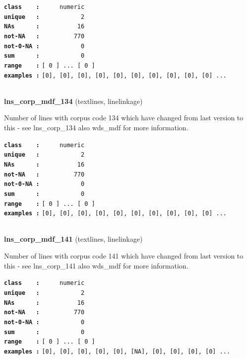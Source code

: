 \documentclass[]{article}
\begin{document}
\textbf{\texttt{class\ \ \ \ :}} \texttt{~~~~~numeric}\\
\textbf{\texttt{unique\ \ \ :}} \texttt{~~~~~~~~~~~2}\\
\textbf{\texttt{NAs\ \ \ \ \ \ :}} \texttt{~~~~~~~~~~16}\\
\textbf{\texttt{not-NA\ \ \ :}} \texttt{~~~~~~~~~770}\\
\textbf{\texttt{not-0-NA\ :}} \texttt{~~~~~~~~~~~0}\\
\textbf{\texttt{sum\ \ \ \ \ \ :}} \texttt{~~~~~~~~~~~0}\\
\textbf{\texttt{range\ \ \ \ :}}
\texttt{{[}\ 0\ {]}\ ...\ {[}\ 0\ {]}}\\
\textbf{\texttt{examples\ :}}
\texttt{{[}0{]},\ {[}0{]},\ {[}0{]},\ {[}0{]},\ {[}0{]},\ {[}0{]},\ {[}0{]},\ {[}0{]},\ {[}0{]},\ {[}0{]}\ ...}\\

~

\textbf{lns\_corp\_mdf\_134} (textlines, linelinkage)

Number of lines with corpus code 134 which have changed from last
version to this - see lns\_corp\_134 also wds\_mdf for more information.

\textbf{\texttt{class\ \ \ \ :}} \texttt{~~~~~numeric}\\
\textbf{\texttt{unique\ \ \ :}} \texttt{~~~~~~~~~~~2}\\
\textbf{\texttt{NAs\ \ \ \ \ \ :}} \texttt{~~~~~~~~~~16}\\
\textbf{\texttt{not-NA\ \ \ :}} \texttt{~~~~~~~~~770}\\
\textbf{\texttt{not-0-NA\ :}} \texttt{~~~~~~~~~~~0}\\
\textbf{\texttt{sum\ \ \ \ \ \ :}} \texttt{~~~~~~~~~~~0}\\
\textbf{\texttt{range\ \ \ \ :}}
\texttt{{[}\ 0\ {]}\ ...\ {[}\ 0\ {]}}\\
\textbf{\texttt{examples\ :}}
\texttt{{[}0{]},\ {[}0{]},\ {[}0{]},\ {[}0{]},\ {[}0{]},\ {[}0{]},\ {[}0{]},\ {[}0{]},\ {[}0{]},\ {[}0{]}\ ...}\\

~

\textbf{lns\_corp\_mdf\_141} (textlines, linelinkage)

Number of lines with corpus code 141 which have changed from last
version to this - see lns\_corp\_141 also wds\_mdf for more information.

\textbf{\texttt{class\ \ \ \ :}} \texttt{~~~~~numeric}\\
\textbf{\texttt{unique\ \ \ :}} \texttt{~~~~~~~~~~~2}\\
\textbf{\texttt{NAs\ \ \ \ \ \ :}} \texttt{~~~~~~~~~~16}\\
\textbf{\texttt{not-NA\ \ \ :}} \texttt{~~~~~~~~~770}\\
\textbf{\texttt{not-0-NA\ :}} \texttt{~~~~~~~~~~~0}\\
\textbf{\texttt{sum\ \ \ \ \ \ :}} \texttt{~~~~~~~~~~~0}\\
\textbf{\texttt{range\ \ \ \ :}}
\texttt{{[}\ 0\ {]}\ ...\ {[}\ 0\ {]}}\\
\textbf{\texttt{examples\ :}}
\texttt{{[}0{]},\ {[}0{]},\ {[}0{]},\ {[}0{]},\ {[}0{]},\ {[}NA{]},\ {[}0{]},\ {[}0{]},\ {[}0{]},\ {[}0{]}\ ...}\\
\end{document}
